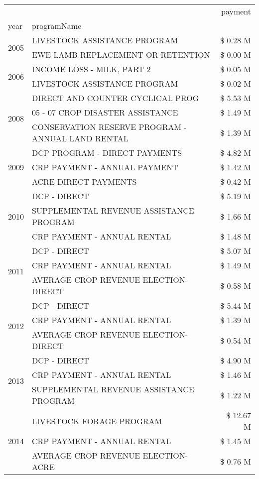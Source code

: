 \begin{tabular}{llr}
\toprule
 &  & payment \\
year & programName &  \\
\midrule
\multirow[t]{2}{*}{2005} & LIVESTOCK ASSISTANCE PROGRAM & \$ 0.28 M \\
 & EWE LAMB REPLACEMENT OR RETENTION & \$ 0.00 M \\
\cline{1-3}
\multirow[t]{2}{*}{2006} & INCOME LOSS - MILK, PART 2 & \$ 0.05 M \\
 & LIVESTOCK ASSISTANCE PROGRAM & \$ 0.02 M \\
\cline{1-3}
\multirow[t]{3}{*}{2008} & DIRECT AND COUNTER CYCLICAL PROG & \$ 5.53 M \\
 & 05 - 07 CROP DISASTER ASSISTANCE & \$ 1.49 M \\
 & CONSERVATION RESERVE PROGRAM - ANNUAL LAND RENTAL & \$ 1.39 M \\
\cline{1-3}
\multirow[t]{3}{*}{2009} & DCP PROGRAM - DIRECT PAYMENTS & \$ 4.82 M \\
 & CRP PAYMENT - ANNUAL PAYMENT & \$ 1.42 M \\
 & ACRE DIRECT PAYMENTS & \$ 0.42 M \\
\cline{1-3}
\multirow[t]{3}{*}{2010} & DCP - DIRECT & \$ 5.19 M \\
 & SUPPLEMENTAL REVENUE ASSISTANCE PROGRAM & \$ 1.66 M \\
 & CRP PAYMENT - ANNUAL RENTAL & \$ 1.48 M \\
\cline{1-3}
\multirow[t]{3}{*}{2011} & DCP - DIRECT & \$ 5.07 M \\
 & CRP PAYMENT - ANNUAL RENTAL & \$ 1.49 M \\
 & AVERAGE CROP REVENUE ELECTION-DIRECT & \$ 0.58 M \\
\cline{1-3}
\multirow[t]{3}{*}{2012} & DCP - DIRECT & \$ 5.44 M \\
 & CRP PAYMENT - ANNUAL RENTAL & \$ 1.39 M \\
 & AVERAGE CROP REVENUE ELECTION-DIRECT & \$ 0.54 M \\
\cline{1-3}
\multirow[t]{3}{*}{2013} & DCP - DIRECT & \$ 4.90 M \\
 & CRP PAYMENT - ANNUAL RENTAL & \$ 1.46 M \\
 & SUPPLEMENTAL REVENUE ASSISTANCE PROGRAM & \$ 1.22 M \\
\cline{1-3}
\multirow[t]{3}{*}{2014} & LIVESTOCK FORAGE PROGRAM & \$ 12.67 M \\
 & CRP PAYMENT - ANNUAL RENTAL & \$ 1.45 M \\
 & AVERAGE CROP REVENUE ELECTION-ACRE & \$ 0.76 M \\

\end{tabular}
